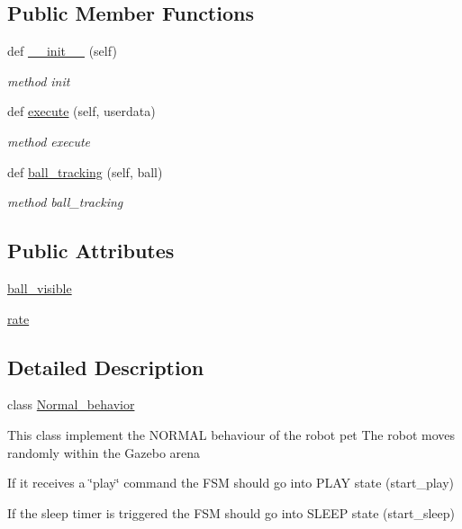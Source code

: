\subsection*{Public Member Functions}
\begin{DoxyCompactItemize}
\item 
def \hyperlink{classbehavior__manager_1_1Normal__behavior_a7ab22900e936fc3921a269389b51e6ab}{\+\_\+\+\_\+init\+\_\+\+\_\+} (self)
\begin{DoxyCompactList}\small\item\em method init \end{DoxyCompactList}\item 
def \hyperlink{classbehavior__manager_1_1Normal__behavior_a15faab6a43a39510355baad4faaa808a}{execute} (self, userdata)
\begin{DoxyCompactList}\small\item\em method execute \end{DoxyCompactList}\item 
def \hyperlink{classbehavior__manager_1_1Normal__behavior_a19d07d077327e725321bc7d13aa3726e}{ball\+\_\+tracking} (self, ball)
\begin{DoxyCompactList}\small\item\em method ball\+\_\+tracking \end{DoxyCompactList}\end{DoxyCompactItemize}
\subsection*{Public Attributes}
\begin{DoxyCompactItemize}
\item 
\hyperlink{classbehavior__manager_1_1Normal__behavior_a9231755f61898994c43ae8e5652ef1c9}{ball\+\_\+visible}
\item 
\hyperlink{classbehavior__manager_1_1Normal__behavior_a8c0881c34370caec4f5298f0ebe35489}{rate}
\end{DoxyCompactItemize}


\subsection{Detailed Description}
class \hyperlink{classbehavior__manager_1_1Normal__behavior}{Normal\+\_\+behavior} 

This class implement the N\+O\+R\+M\+AL behaviour of the robot pet The robot moves randomly within the Gazebo arena
\begin{DoxyItemize}
\item If it receives a \char`\"{}play\char`\"{} command the F\+SM should go into P\+L\+AY state (start\+\_\+play)
\item If the sleep timer is triggered the F\+SM should go into S\+L\+E\+EP state (start\+\_\+sleep) 
\end{DoxyItemize}

